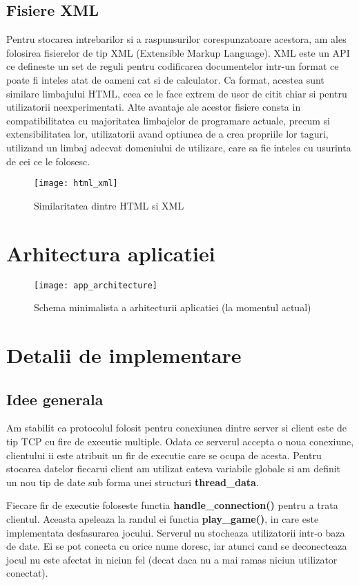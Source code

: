 \documentclass[runningheads]{llncs}
\begin{document}
\subsection{Fisiere XML}
Pentru stocarea intrebarilor si a raspunsurilor corespunzatoare acestora, am ales folosirea fisierelor de tip XML (Extensible Markup Language).
XML este un API ce defineste un set de reguli pentru codificarea documentelor intr-un format ce poate fi inteles atat de oameni cat si de calculator.
Ca format, acestea sunt similare limbajului HTML, ceea ce le face extrem de usor de citit chiar si pentru utilizatorii neexperimentati.
Alte avantaje ale acestor fisiere consta in compatibilitatea cu majoritatea limbajelor de programare actuale, precum si extensibilitatea lor, utilizatorii avand optiunea de a crea propriile lor taguri, utilizand un limbaj adecvat domeniului de utilizare, care sa fie inteles cu usurinta de cei ce le folosesc.
\begin{figure}[H]
\centering
\texttt{[image: html\_xml]}
\caption{Similaritatea dintre HTML si XML}
\end{figure}
\newpage

\section{Arhitectura aplicatiei}
\begin{figure}[H]
\centering
\texttt{[image: app\_architecture]}
\caption{Schema minimalista a arhitecturii aplicatiei (la momentul actual)}
\end{figure}
\newpage

\section{Detalii de implementare}
\subsection{Idee generala}
Am stabilit ca protocolul folosit pentru conexiunea dintre server si client este de tip TCP cu fire de executie multiple.
Odata ce serverul accepta o noua conexiune, clientului ii este atribuit un fir de executie care se ocupa de acesta.
Pentru stocarea datelor fiecarui client am utilizat cateva variabile globale si am definit un nou tip de date sub forma unei structuri \textbf{thread\_data}.
\newline

\noindent
Fiecare fir de executie foloseste functia \textbf{handle\_connection()} pentru a trata clientul. 
Aceasta apeleaza la randul ei functia  \textbf{play\_game()}, in care este implementata desfasurarea jocului.
Serverul nu stocheaza utilizatorii intr-o baza de date. Ei se pot conecta cu orice nume doresc, iar atunci cand se deconecteaza jocul nu este afectat in niciun fel (decat daca nu a mai ramas niciun utilizator conectat).
\end{document}
